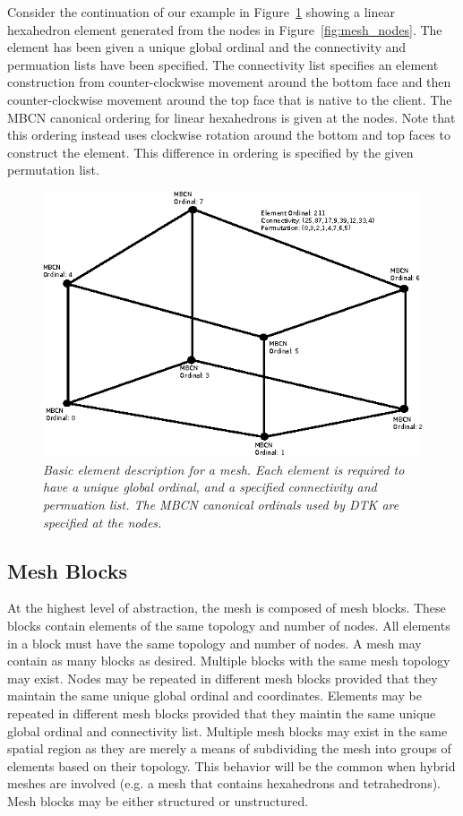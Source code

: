 \documentclass[letterpaper,12pt]{article}
\begin{document}
Consider the continuation of our example in
Figure~\ref{fig:mesh_element} showing a linear hexahedron element
generated from the nodes in Figure~\ref{fig:mesh_nodes}. The element
has been given a unique global ordinal and the connectivity and
permuation lists have been specified. The connectivity list specifies
an element construction from counter-clockwise movement around the
bottom face and then counter-clockwise movement around the top face
that is native to the client. The MBCN canonical ordering for linear
hexahedrons is given at the nodes. Note that this ordering instead
uses clockwise rotation around the bottom and top faces to construct
the element. This difference in ordering is specified by the given
permutation list.

\begin{figure}[htpb!]
  \centering
  \includegraphics[width=5in]{hex_element.eps}
  \caption{\sl Basic element description for a mesh. Each element is
    required to have a unique global ordinal, and a specified
    connectivity and permuation list. The MBCN canonical ordinals used
    by DTK are specified at the nodes.}
  \label{fig:mesh_element}
\end{figure}

\subsection{Mesh Blocks}\label{subsec:blocks}
At the highest level of abstraction, the mesh is composed of mesh
blocks. These blocks contain elements of the same topology and number
of nodes. All elements in a block must have the same topology and
number of nodes. A mesh may contain as many blocks as
desired. Multiple blocks with the same mesh topology may exist. Nodes
may be repeated in different mesh blocks provided that they maintain
the same unique global ordinal and coordinates. Elements may be
repeated in different mesh blocks provided that they maintin the same
unique global ordinal and connectivity list. Multiple mesh blocks may
exist in the same spatial region as they are merely a means of
subdividing the mesh into groups of elements based on their
topology. This behavior will be the common when hybrid meshes are
involved (e.g. a mesh that contains hexahedrons and
tetrahedrons). Mesh blocks may be either structured or unstructured.
\end{document}

